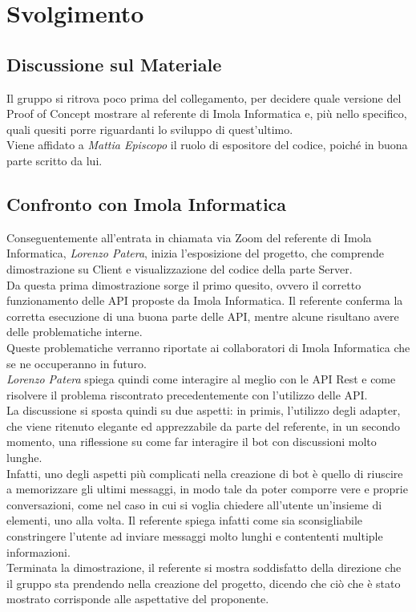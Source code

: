 \section{Svolgimento}

\subsection{Discussione sul Materiale} 
  Il gruppo si ritrova poco prima del collegamento, per decidere quale versione del Proof of Concept mostrare al referente di Imola Informatica e, più nello specifico, 
  quali quesiti porre riguardanti lo sviluppo di quest'ultimo. \\ 
  Viene affidato a \textit{Mattia Episcopo} il ruolo di espositore del codice, poiché in buona parte scritto da lui.
\subsection{Confronto con Imola Informatica}
  Conseguentemente all'entrata in chiamata via Zoom del referente di Imola Informatica, \textit{Lorenzo Patera}, inizia l'esposizione del progetto, che comprende dimostrazione su
  Client e visualizzazione del codice della parte Server. \\
  Da questa prima dimostrazione sorge il primo quesito, ovvero il corretto funzionamento delle API proposte da Imola Informatica. Il referente conferma
  la corretta esecuzione di una buona parte delle API, mentre alcune risultano avere delle problematiche interne. \\ 
  Queste problematiche verranno riportate ai collaboratori di Imola Informatica che se ne occuperanno in futuro.\\
  \textit{Lorenzo Patera} spiega quindi come interagire al meglio con le API Rest e come risolvere il problema riscontrato precedentemente con l'utilizzo delle API. \\
  La discussione si sposta quindi su due aspetti: in primis, l'utilizzo degli adapter, che viene ritenuto elegante ed apprezzabile da parte del referente, 
  in un secondo momento, una riflessione su come far interagire il bot con discussioni molto lunghe. \\
  Infatti, uno degli aspetti più complicati nella creazione di bot è quello di riuscire a memorizzare gli ultimi messaggi, in modo tale da poter comporre vere e proprie 
  conversazioni, come nel caso in cui si voglia chiedere all'utente un'insieme di elementi, uno alla volta. Il referente spiega infatti come sia sconsigliabile constringere 
  l'utente ad inviare messaggi molto lunghi e contententi multiple informazioni. \\
  Terminata la dimostrazione, il referente si mostra soddisfatto della direzione che il gruppo sta prendendo nella creazione del progetto, dicendo che ciò che è stato mostrato
  corrisponde alle aspettative del proponente.
